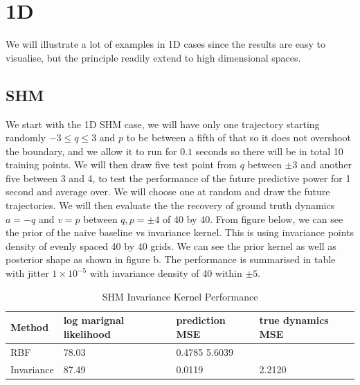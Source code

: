 \documentclass{statsmsc}
\begin{document}
\section{1D}
We will illustrate a lot of examples in 1D cases since the results are easy to visualise, but the principle readily extend to high dimensional spaces. 

\subsection{SHM}
We start with the 1D SHM case, we will have only one trajectory starting randomly $-3\le q\le3$ and $p$ to be between a fifth of that so it does not overshoot the boundary, and we allow it to run for $0.1$ seconds so there will be in total 10 training points. 
We will then draw five test point from $q$ between $\pm 3$ and another five between 3 and 4, to test the performance of the future predictive power for 1 second and average over. 
We will choose one at random and draw the future trajectories.
We will then evaluate the the recovery of ground truth dynamics $a=-q$ and $v=p$ between $q, p=\pm 4$ of 40 by 40.
From figure below, we can see the prior of the naive baseline vs invariance kernel.
This is using invariance points density of evenly spaced 40 by 40 grids. 
We can see the prior kernel as well as posterior shape as shown in figure b.
The performance is summarised in table with jitter $1\times 10^{-5}$ with invariance density of 40 within $\pm 5$. 
\begin{table}[H]
  \centering
  \begin{tabular}{l l l l }
\hline
Method           & log marignal likelihood & prediction MSE &  true dynamics  MSE\\
                    \hline
RBF & 78.03 & 0.4785 5.6039 \\
Invariance & 87.49 & 0.0119 &2.2120 \\
\hline
  \end{tabular}
  \caption{SHM Invariance Kernel Performance }
  \label{tab:shm_performance}
\end{table}
\end{document}
